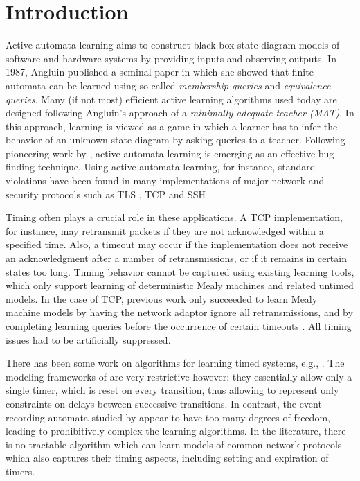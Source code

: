 \section{Introduction}
\label{sec:intro}

Active automata learning aims to construct black-box state diagram models of software and hardware systems
by providing inputs and observing outputs.
In 1987, Angluin \cite{Ang87} published a seminal paper in which she showed that finite automata can be learned using so-called 
\emph{membership queries} and \emph{equivalence queries}.
Many (if not most) efficient active learning algorithms used
today are designed following Angluin's approach of a \emph{minimally adequate teacher (MAT)}.
In this approach, learning is viewed as a game in which a learner has to infer the behavior of
an unknown state diagram by asking queries to a teacher.
Following pioneering work by \cite{Ang87,PeVaYa02,Hagerer2002,RaMeSM2009,IsHoSt2015},
active automata learning is emerging as an effective bug finding technique.
Using active automata learning, for instance, standard violations have been found in many implementations of
major network and security protocols such as TLS \cite{dRP15}, TCP \cite{FJV14,FJV16,FH17} and SSH \cite{FiterauEtAl17}.

Timing often plays a crucial role in these applications.
A TCP implementation, for instance, may retransmit packets if they are not acknowledged within
a specified time. Also, a timeout may occur if the implementation does not receive an acknowledgment
after a number of retransmissions, or if it remains in certain states too long.
Timing behavior cannot be captured using existing learning tools, which only support learning of deterministic
Mealy machines and related untimed models.
In the case of TCP, previous work only succeeded to learn Mealy machine models by having the network adaptor 
ignore all retransmissions, and by completing learning queries before the occurrence of certain timeouts \cite{FJV16}.
All timing issues had to be artificially suppressed.

There has been some work on algorithms for learning timed systems, e.g., \cite{GrinchteinJP06,GrinchteinJL10,CCF16,VWW:rti}.
The modeling frameworks of \cite{VWW:rti,CCF16} are very restrictive however: they essentially allow only a single timer, which is reset on every transition,
thus allowing to represent only constraints on delays between successive transitions. In contrast, the event recording automata studied by \cite{GrinchteinJP06,GrinchteinJL10} appear to have too many degrees of freedom, leading to
prohibitively complex the learning algorithms.
In the literature, there is no tractable algorithm which can learn models of
common network protocols which also captures their timing aspects, including
setting and expiration of timers.

